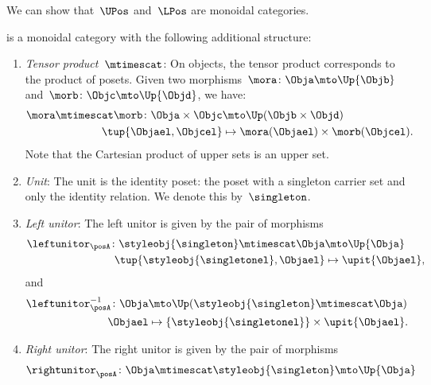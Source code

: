 We can show that~$\UPos$ and~$\LPos$ are monoidal categories.


\begin{lemma}
\label{lem:upos_moncat}
\UPos is a monoidal category with the following additional structure:
\begin{enumerate}
    \item \emph{Tensor product~$\mtimescat$}: On objects, the tensor product corresponds to the product of posets. Given two morphisms~$\mora\colon \Obja\mto \Up{\Objb}$ and~$\morb\colon \Objc\mto \Up{\Objd}$, we have:
    \begin{equation}
    \begin{aligned}
        \mora \mtimescat \morb\colon \Obja \times \Objc &\mto \Up(\Objb\times \Objd)\\
        \tup{\Objael,\Objcel}&\mapsto \mora(\Objael)\times \morb(\Objcel).
    \end{aligned}
    \end{equation}
    Note that the Cartesian product of upper sets is an upper set.
    \item \emph{Unit}: The unit is the identity poset: the poset with a singleton carrier set and only the identity relation.
    We denote this by~$\singleton$.
    \item \emph{Left unitor}: The left unitor is given by the pair of morphisms
    \begin{equation}
        \begin{aligned}
            \leftunitor_\posA\colon \styleobj{\singleton}\mtimescat \Obja &\mto \Up{\Obja}\\
            \tup{\styleobj{\singletonel},\Objael}&\mapsto \upit\{\Objael\},
        \end{aligned}
    \end{equation}
    and
    \begin{equation}
        \begin{aligned}
            \leftunitor_\posA^{-1}\colon \Obja &\mto \Up(\styleobj{\singleton}\mtimescat \Obja) \\
            \Objael&\mapsto \{\styleobj{\singletonel}\} \times \upit \{\Objael\}.
        \end{aligned}
    \end{equation}
    \item \emph{Right unitor}: The right unitor is given by the pair of morphisms
    \begin{equation}
        \begin{aligned}
            \rightunitor_\posA\colon \Obja\mtimescat \styleobj{\singleton}  &\mto \Up{\Obja}\\

\end{aligned}
\end{equation}
\end{enumerate}
\end{lemma}
